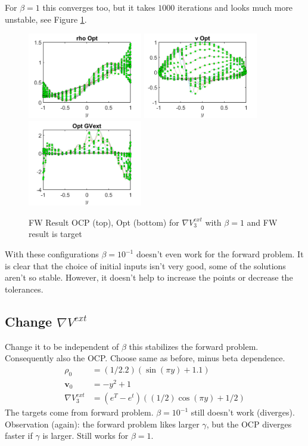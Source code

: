 \documentclass[11pt, a4paper]{article}
\theoremstyle{definition}
\newcommand{\Stav}{\mathbf{v}}
\begin{document}
For $\beta = 1$ this converges too, but it takes $1000$ iterations and looks much more unstable, see Figure \ref{Figure10}.
\begin{figure}
	\includegraphics[width=5cm]{Optrho4.png}
	\includegraphics[width=5cm]{Optv4.png}
	\includegraphics[width=5cm]{OptCont4.png}
	\caption{FW Result OCP (top), Opt (bottom) for $\nabla V^{ext}_3 $ with $\beta =1$ and FW result is target}
	\label{Figure10}
\end{figure}
With these configurations $\beta = 10^{-1}$ doesn't even work for the forward problem. It is clear that the choice of initial inputs isn't very good, some of the solutions aren't so stable. However, it doesn't help to increase the points or decrease the tolerances.
\subsection{Change $\nabla V^{ext}$}
Change it to be independent of $\beta$ this stabilizes the forward problem.
Consequently also the OCP.
Choose same as before, minus beta dependence.
\begin{align*}
\rho_0 &= (1/2.2)(\sin(\pi y) + 1.1)\\
\Stav_0 &=  -y^2 + 1\\
\nabla V^{ext}_3 &= (e^{T}-e^t)((1/2)\cos(\pi y) +1/2)
\end{align*}
The targets come from forward problem.
$\beta = 10^{-1}$ still doesn't work (diverges). Observation (again): the forward problem likes larger $\gamma$, but the OCP diverges faster if $\gamma$ is larger. Still works for $\beta = 1$.
\end{document}
